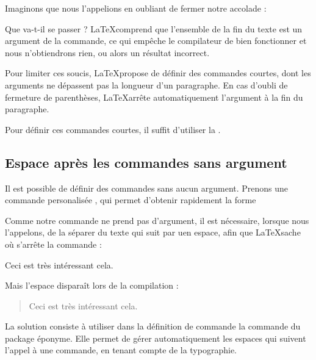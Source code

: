 Imaginons que nous l'appelions en oubliant de fermer notre accolade :

\begin{latexcode}
Il est bien connu que \auteur{Tertullien n'était pas montaniste
 mais tertullianiste.
\end{latexcode}

Que va-t-il se passer ? \LaTeX comprend que l'ensemble de la fin du texte est un argument de la commande, ce qui empêche le compilateur de bien fonctionner  et nous n'obtiendrons rien, ou alors un résultat incorrect.

Pour limiter ces soucis, \LaTeX propose de définir des commandes courtes, dont les arguments ne dépassent pas la longueur d'un paragraphe. En cas d'oubli de fermeture de parenthèses, \LaTeX arrête automatiquement l'argument à la fin du paragraphe.

Pour définir ces commandes courtes, il suffit d'utiliser la .

\begin{latexcode}
\newcommand*{\auteur}[1]{\textsc{#1}*}
\end{latexcode}

\subsection{Espace après les commandes sans argument}


Il est possible de définir des commandes sans aucun argument. Prenons une commande personalisée , qui permet d'obtenir rapidement la forme \forme{\cf}

\begin{latexcode}
\newcommand{\cf}[0]{\emph{cf.}}
\end{latexcode}

Comme notre commande ne prend pas d'argument, il est nécessaire, lorsque nous l'appelons, de la séparer du texte qui suit par uen espace, afin que \LaTeX sache où s'arrête la commande : 

\begin{latexcode}
Ceci est très intéressant \cf cela.
\end{latexcode}

Mais  l'espace disparaît lors de la compilation :

\begin{quotation}
Ceci est très intéressant \cf cela.
\end{quotation}

La solution consiste à utiliser dans la définition de commande la commande  du package éponyme. Elle permet de gérer automatiquement les espaces qui suivent l'appel à une commande, en tenant compte de la typographie.

